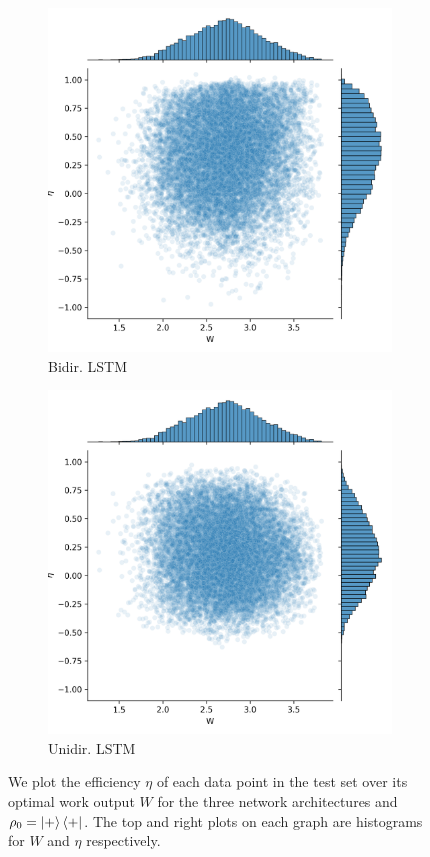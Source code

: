 \begin{figure}
\begin{subfigure}{0.32\textwidth}
		\includegraphics[width=\textwidth]{img/work_dist_n5_eigen_bi}
		\caption{Bidir. LSTM}
		\label{}
	\end{subfigure}
	\begin{subfigure}{0.32\textwidth}
	\centering
	\includegraphics[width=\textwidth]{img/work_dist_n5_eigen_uni}
	\caption{Unidir. LSTM}
	\label{}
\end{subfigure}
	\caption{We plot the efficiency $\eta$ of each data point in the test set over its optimal work output $W$ for the three network architectures and $\rho_0 = \ket{+}\bra{+}$. The top and right plots on each graph are histograms for $W$ and $\eta$ respectively.}
	\label{}
\end{figure}

